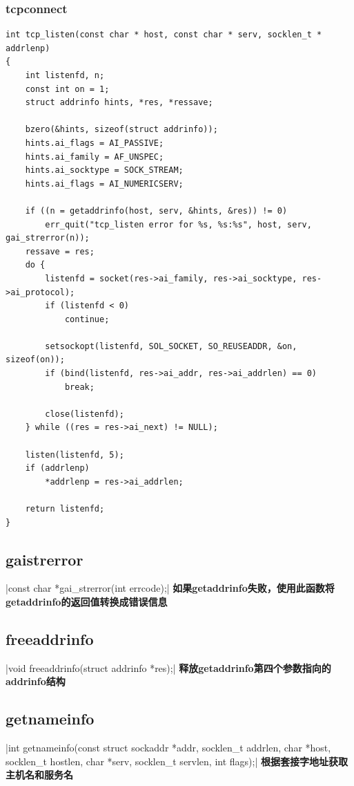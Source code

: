 \subsubsection{tcp\li connect}
\begin{verbatim}
int tcp_listen(const char * host, const char * serv, socklen_t * addrlenp)
{
    int listenfd, n;
    const int on = 1;
    struct addrinfo hints, *res, *ressave;

    bzero(&hints, sizeof(struct addrinfo));
    hints.ai_flags = AI_PASSIVE;
    hints.ai_family = AF_UNSPEC;
    hints.ai_socktype = SOCK_STREAM;
    hints.ai_flags = AI_NUMERICSERV;

    if ((n = getaddrinfo(host, serv, &hints, &res)) != 0)
        err_quit("tcp_listen error for %s, %s:%s", host, serv, gai_strerror(n));
    ressave = res;
    do {
        listenfd = socket(res->ai_family, res->ai_socktype, res->ai_protocol);
        if (listenfd < 0)
            continue;

        setsockopt(listenfd, SOL_SOCKET, SO_REUSEADDR, &on, sizeof(on));
        if (bind(listenfd, res->ai_addr, res->ai_addrlen) == 0)
            break;

        close(listenfd);
    } while ((res = res->ai_next) != NULL);

    listen(listenfd, 5);
    if (addrlenp)
        *addrlenp = res->ai_addrlen;

    return listenfd;
}
\end{verbatim}
\newpage

\subsection{gai\li strerror}
|const char *gai_strerror(int errcode);|
\noindent \textbf{如果getaddrinfo失败，使用此函数将getaddrinfo的返回值转换成错误信息}
\newpage

\subsection{freeaddrinfo}
|void freeaddrinfo(struct addrinfo *res);|
\noindent \textbf{释放getaddrinfo第四个参数指向的addrinfo结构}
\newpage

\subsection{getnameinfo}
|int getnameinfo(const struct sockaddr *addr, socklen_t addrlen, char *host, socklen_t hostlen, char *serv, socklen_t servlen, int flags);|
\noindent \textbf{根据套接字地址获取主机名和服务名}

